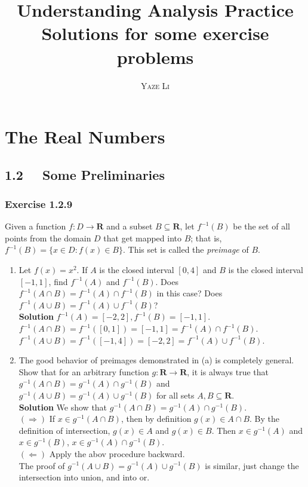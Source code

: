 \documentclass[12pt]{report}
\title{\Huge \textbf{Understanding Analysis Practice} %
\\ \huge Solutions for some exercise problems %
}
\author{\textsc{Yaze Li}%
}
\begin{document}
\maketitle
\tableofcontents
\chapter{The Real Numbers}
\section{1.2 ~~Some Preliminaries}
\subsection*{Exercise 1.2.9}
Given a function $f:D \to \mathbf{R} $ and a subset $B \subseteq  \mathbf{R}$, let $f^{-1}(B)$ be the set of all points from the domain $D$ that get mapped into $B$;
that is, $f^{-1}(B) = \{x \in D: f(x) \in B\}$. This set is called the \textit{preimage} of $B$.
\begin{enumerate}[label=(\alph*)]
    \item Let $f(x)=x^2$. If $A$ is the closed interval $[0,4]$ and $B$ is the closed interval $[-1,1]$, find $f^{-1}(A)$ and $f^{-1}(B)$. Does $f^{-1}(A \cap B) = f^{-1}(A) \cap f^{-1}(B)$ in this case?
    Does $f^{-1}(A \cup B) = f^{-1}(A) \cup f^{-1}(B)$?\\
    \textbf{Solution} $f^{-1}(A)=[-2,2],f^{-1}(B)=[-1,1]$.\\
    $f^{-1}(A \cap B) = f^{-1}([0,1]) = [-1,1] = f^{-1}(A) \cap f^{-1}(B)$.\\
    $f^{-1}(A \cup B) = f^{-1}([-1,4]) = [-2,2] = f^{-1}(A) \cup f^{-1}(B)$.
    \item The good behavior of preimages demonstrated in (a) is completely general. Show that for an arbitrary function $g: \mathbf{R} \rightarrow \mathbf{R}$, it is always true that $g^{-1}(A \cap B)=g^{-1}(A) \cap g^{-1}(B)$ and $g^{-1}(A \cup B)=g^{-1}(A) \cup g^{-1}(B)$ for all sets $A, B \subseteq \mathbf{R}$.\\
    \textbf{Solution} We show that $g^{-1}(A \cap B)=g^{-1}(A) \cap g^{-1}(B)$.\\
    $(\Rightarrow)$ If $x \in g^{-1}(A \cap B)$, then by definition $g(x) \in A \cap B$. By the definition of intersection, $g(x) \in A$ and $g(x) \in B$.
    Then $x \in g^{-1}(A)$ and $x \in g^{-1}(B)$, $x \in g^{-1}(A) \cap g^{-1}(B)$.\\
    $(\Leftarrow)$ Apply the abov procedure backward.\\
    The proof of $g^{-1}(A \cup B)=g^{-1}(A) \cup g^{-1}(B)$ is similar, just change the intersection into union, and into or.
\end{enumerate}
\end{document}

